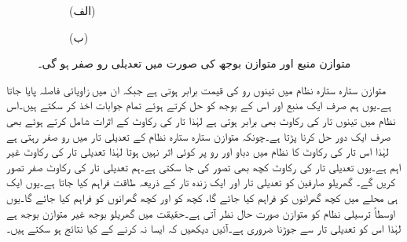 \begin{figure}
\centering
\begin{subfigure}{0.5\textwidth}
\centering
{}
\caption*{(الف)}
\end{subfigure}%
\begin{subfigure}{0.5\textwidth}
\centering
{}
\caption*{(ب)}
\end{subfigure}
\caption{متوازن منبع اور متوازن بوجھ کی صورت میں تعدیلی رو صفر  ہو گی۔}
\label{شکل_تین_دوری_تعدیلی_رو_صفر}
\end{figure}

متوازن ستارہ ستارہ نظام میں تینوں رو کی قیمت برابر ہوتی ہے جبکہ ان میں زاویائی فاصلہ  پایا جاتا ہے۔یوں ہم صرف ایک منبع اور اس کے بوجھ کو حل کرتے ہوئے تمام جوابات اخذ کر سکتے ہیں۔اس نظام میں تینوں تار کی رکاوٹ بھی برابر ہوتی ہے لہٰذا تار کی رکاوٹ کے اثرات شامل کرتے ہوئے بھی صرف ایک دور حل کرنا پڑتا ہے۔چونکہ متوازن ستارہ ستارہ نظام کے تعدیلی تار میں رو صفر رہتی ہے لہٰذا اس تار کی رکاوٹ کا نظام میں دباو اور رو پر کوئی اثر نہیں ہوتا لہٰذا تعدیلی تار کی رکاوٹ غیر اہم ہے۔یوں تعدیلی تار کی رکاوٹ کچھ بھی تصور کی جا سکتی ہے۔ہم تعدیلی تار کی رکاوٹ صفر تصور کریں گے۔
گھریلو صارفین کو تعدیلی تار اور ایک زندہ تار کے ذریعہ طاقت فراہم کیا جاتا ہے۔یوں ایک ہی محلے میں کچھ گھرانوں کو  فراہم کیا جائے گا، کچھ کو
  اور کچھ گھرانوں کو  فراہم کیا جائے گا۔یوں اوسطاً ترسیلی نظام کو متوازن صورت حال نظر آتی ہے۔حقیقت میں گھریلو بوجھ غیر متوازن بوجھ ہے لہٰذا اس کو تعدیلی تار سے جوڑنا ضروری ہے۔آئیں دیکھیں کہ ایسا نہ کرنے کے کیا نتائج  ہو سکتے ہیں۔

